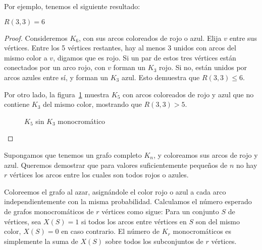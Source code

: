   Por ejemplo,
  tenemos el siguiente resultado:
  \begin{theorem}
    \label{theo:R(3,3)=6}
    \(R(3, 3) = 6\)
  \end{theorem}
  \begin{proof}
    Consideremos \(K_6\),
    con sus arcos coloreados de rojo o azul.
    Elija \(v\) entre sus vértices.
    Entre los \num{5} vértices restantes,
    hay al menos \num{3} unidos con arcos del mismo color a \(v\),
    digamos que es rojo.
    Si un par de estos tres vértices están conectados por un arco rojo,
    con \(v\) forman un \(K_3\) rojo.
    Si no,
    están unidos por arcos azules entre sí,
    y forman un \(K_3\) azul.
    Esto demuestra que \(R(3, 3) \le 6\).

    Por otro lado,
    la figura~\ref{fig:K5-dos-colores} muestra \(K_5\)
    con arcos coloreados de rojo y azul
    que no contiene \(K_3\) del mismo color,
    mostrando que \(R(3, 3) > 5\).
    \begin{figure}[ht]
      \centering
      \caption{\(K_5\) sin \(K_3\) monocromático}
      \label{fig:K5-dos-colores}
    \end{figure}
  \end{proof}

  Supongamos que tenemos un grafo completo \(K_n\),
  y coloreamos sus arcos de rojo y azul.
  Queremos demostrar que para valores suficientemente pequeños de \(n\)
  no hay \(r\) vértices los arcos entre los cuales son todos rojos o azules.

  Coloreemos el grafo al azar,
  asignándole el color rojo o azul a cada arco independientemente
  con la misma probabilidad.
  Calculamos el número esperado de grafos monocromáticos de \(r\) vértices
  como sigue:
  Para un conjunto \(S\) de vértices,
  sea \(X(S) = 1\)
  si todos los arcos entre vértices en \(S\) son del mismo color,
  \(X(S) = 0\) en caso contrario.
  El número de \(K_r\) monocromáticos es simplemente la suma de \(X(S)\)
  sobre todos los subconjuntos de \(r\) vértices.

